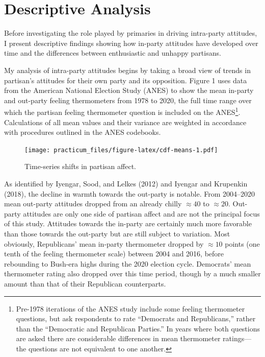 \documentclass[
]{article}
\begin{document}
\hypertarget{descriptive-analysis}{%
\section{Descriptive Analysis}\label{descriptive-analysis}}

Before investigating the role played by primaries in driving intra-party attitudes, I present descriptive findings showing how in-party attitudes have developed over time and the differences between enthusiastic and unhappy partisans.

My analysis of intra-party attitudes begins by taking a broad view of trends in partisan's attitudes for their own party and its opposition. Figure 1 uses data from the American National Election Study (ANES) to show the mean in-party and out-party feeling thermometers from 1978 to 2020, the full time range over which the partisan feeling thermometer question is included on the ANES\footnote{Pre-1978 iterations of the ANES study include some feeling thermometer questions, but ask respondents to rate ``Democrats and Republicans,'' rather than the ``Democratic and Republican Parties.'' In years where both questions are asked there are considerable differences in mean thermometer ratings---the questions are not equivalent to one another.}. Calculations of all mean values and their variance are weighted in accordance with procedures outlined in the ANES codebooks.

\begin{figure}
\centering
\texttt{[image: practicum\_files/figure-latex/cdf-means-1.pdf]}
\caption{\label{fig:cdf-means}Time-series shifts in partisan affect.}
\end{figure}

As identified by Iyengar, Sood, and Lelkes (2012) and Iyengar and Krupenkin (2018), the decline in warmth towards the out-party is notable. From 2004--2020 mean out-party attitudes dropped from an already chilly \(\approx{40}\) to \(\approx 20\). Out-party attitudes are only one side of partisan affect and are not the principal focus of this study. Attitudes towards the in-party are certainly much more favorable than those towards the out-party but are still subject to variation. Most obviously, Republicans' mean in-party thermometer dropped by \(\approx{10}\) points (one tenth of the feeling thermometer scale) between 2004 and 2016, before rebounding to Bush-era highs during the 2020 election cycle. Democrats' mean thermometer rating also dropped over this time period, though by a much smaller amount than that of their Republican counterparts.
\end{document}
